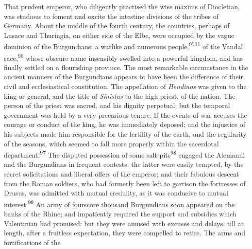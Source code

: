 

That prudent emperor, who diligently practised the wise maxims of
Diocletian, was studious to foment and excite the intestine
divisions of the tribes of Germany. About the middle of the
fourth century, the countries, perhaps of Lusace and Thuringia,
on either side of the Elbe, were occupied by the vague dominion
of the Burgundians; a warlike and numerous people,\textsuperscript{9511} of the
Vandal race,\textsuperscript{96} whose obscure name insensibly swelled into a
powerful kingdom, and has finally settled on a flourishing
province. The most remarkable circumstance in the ancient manners
of the Burgundians appears to have been the difference of their
civil and ecclesiastical constitution. The appellation of
\textit{Hendinos} was given to the king or general, and the title of
\textit{Sinistus} to the high priest, of the nation. The person of the
priest was sacred, and his dignity perpetual; but the temporal
government was held by a very precarious tenure. If the events of
war accuses the courage or conduct of the king, he was
immediately deposed; and the injustice of his subjects made him
responsible for the fertility of the earth, and the regularity of
the seasons, which seemed to fall more properly within the
sacerdotal department.\textsuperscript{97} The disputed possession of some
salt-pits\textsuperscript{98} engaged the Alemanni and the Burgundians in frequent
contests: the latter were easily tempted, by the secret
solicitations and liberal offers of the emperor; and their
fabulous descent from the Roman soldiers, who had formerly been
left to garrison the fortresses of Drusus, was admitted with
mutual credulity, as it was conducive to mutual interest.\textsuperscript{99} An
army of fourscore thousand Burgundians soon appeared on the banks
of the Rhine; and impatiently required the support and subsidies
which Valentinian had promised: but they were amused with excuses
and delays, till at length, after a fruitless expectation, they
were compelled to retire. The arms and fortifications of the
